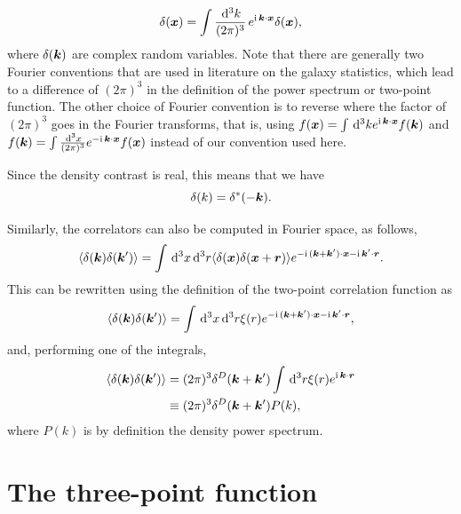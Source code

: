 \begin{equation}
	\delta({\bm {x}}) = \int \frac{\,\mathrm{d}^3k}{(2\pi)^3} \, e^{\mathrm{i\,} \bm {k} \cdot \bm {x} } \delta(\bm {x}),
\end{equation}
where $\delta(\bm {k})$ are complex random variables. Note that there are generally two Fourier conventions that are used in literature on the galaxy statistics, which lead to a difference of $(2\pi)^3$ in the definition of the power spectrum or two-point function. The other choice of Fourier convention is to reverse where the factor of $(2\pi)^3$ goes in the Fourier transforms, that is, using $f(\bm {x}) = \int \,\mathrm{d}^3k e^{\mathrm{i\,} \bm {k} \cdot \bm {x}} f(\bm {k}) $ and $f(\bm {k}) = \int \frac{\,\mathrm{d}^3 x}{(2\pi)^3} e^{-\mathrm{i\,} \bm {k} \cdot \bm {x}} f(\bm {x})$ instead of our convention used here.

Since the density contrast is real, this means that we have
\begin{equation}
	\delta(k) = \delta^*(-\bm {k}).
\end{equation}

Similarly, the correlators can also be computed in Fourier space, as follows, 
\begin{equation}
	\langle \delta(\bm {k}) \delta(\bm {k}') \rangle = \int \,\mathrm{d}^3 x \,\mathrm{d}^3 r \langle \delta(\bm {x}) \delta(\bm {x} + \bm{r})\rangle e^{-\mathrm{i\,} (\bm {k} + \bm {k}') \cdot \bm {x} - \mathrm{i\,} \bm {k}' \cdot \bm{r}}.
\end{equation}
This can be rewritten using the definition of the two-point correlation function as 
\begin{equation}
	\langle \delta(\bm {k}) \delta(\bm {k}') \rangle = \int \,\mathrm{d}^3 x \,\mathrm{d}^3 r \xi(r) e^{-\mathrm{i\,} (\bm {k} + \bm {k}') \cdot \bm {x} - \mathrm{i\,} \bm {k}' \cdot \bm{r}},
\end{equation}
and, performing one of the integrals, 
\begin{align}
	\langle \delta(\bm {k}) \delta(\bm {k}') \rangle &= (2\pi)^3 \delta^D(\bm {k} + \bm {k}') \int \,\mathrm{d}^3 r \xi(r) e^{\mathrm{i\,} \bm {k} \cdot \bm{r}} \\
	&\equiv (2\pi)^3 \delta^D(\bm {k} + \bm {k}') P(k),
\end{align}
where $P(k)$ is by definition the density power spectrum.


\section{The three-point function}

